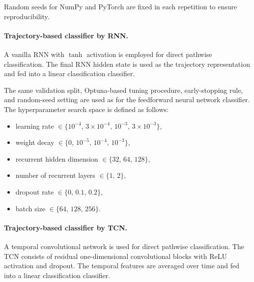 \documentclass{article}
\theoremstyle{plain}
\theoremstyle{definition}
\theoremstyle{remark}
\begin{document}
Random seeds for NumPy and PyTorch are fixed in each repetition to ensure reproducibility.


\paragraph{Trajectory-based classifier by RNN.}
A vanilla RNN with $\tanh$ activation is employed for direct pathwise classification.
The final RNN hidden state is used as the trajectory representation and fed into a linear classification classifier.

The same validation split, Optuna-based tuning procedure, early-stopping rule, and random-seed setting are used as for the feedforward neural network classifier. 
The hyperparameter search space is defined as follows:

\begin{itemize}

    \item learning rate $\in \{10^{-4},\, 3\times10^{-4},\, 10^{-3},\, 3\times10^{-3}\}$,

    \item weight decay $\in\{0,\, 10^{-5},\, 10^{-4},\, 10^{-3}\}$,

    \item recurrent hidden dimension $\in\{32,\,64,\,128\}$,

    \item number of recurrent layers $\in\{1,\,2\}$,

    \item dropout rate $\in\{0,\,0.1,\,0.2\}$,

    \item batch size $\in\{64,\,128,\,256\}$.

\end{itemize}


\paragraph{Trajectory-based classifier by TCN.}
A temporal convolutional network is used for direct pathwise classification.
The TCN consists of residual one-dimensional convolutional blocks with ReLU activation and dropout.
The temporal features are averaged over time and fed into a linear classification classifier.
\end{document}
